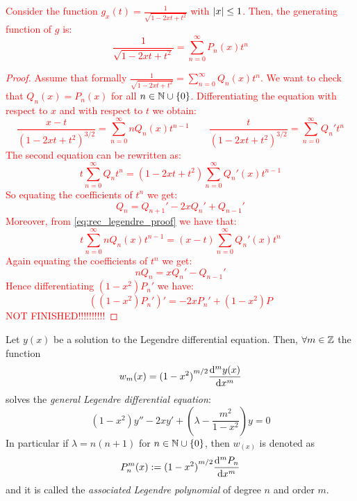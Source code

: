 \documentclass[../main.tex]{subfiles}
\begin{document}
\textcolor{red}{\begin{proposition}
    Consider the function $g_x(t)=\frac{1}{\sqrt{1-2xt+t^2}}$ with $\abs{x}\leq 1$. Then, the generating function of $g$ is:
    \begin{equation}
      \frac{1}{\sqrt{1-2xt+t^2}}=\sum_{n=0}^{\infty}P_n(x)t^n
    \end{equation}
  \end{proposition}
  \begin{proof}
    Assume that formally $\frac{1}{\sqrt{1-2xt+t^2}}=\sum_{n=0}^{\infty}Q_n(x)t^n$. We want to check that $Q_n(x)=P_n(x)$ for all $n\in\mathbb{N}\cup\{0\}$. Differentiating the equation with respect to $x$ and with respect to $t$ we obtain:
    \begin{equation}\label{eq:rec_legendre_proof}
      \frac{x-t}{{(1-2xt+t^2)}^{3/2}}=\sum_{n=0}^{\infty}nQ_n(x)t^{n-1}\qquad\frac{t}{{(1-2xt+t^2)}^{3/2}}=\sum_{n=0}^{\infty}{Q_n}'t^n
    \end{equation}
    The second equation can be rewritten as:
    \begin{equation}
      t\sum_{n=0}^{\infty}Q_n t^n=(1-2xt+t^2)\sum_{n=0}^{\infty}{Q_n}'(x)t^{n-1}
    \end{equation}
    So equating the coefficients of $t^n$ we get:
    \begin{equation}
      Q_{n}={Q_{n+1}}'-2x{Q_n}'+{Q_{n-1}}'
    \end{equation}
    Moreover, from \cref{eq:rec_legendre_proof} we have that:
    \begin{equation}
      t\sum_{n=0}^{\infty}nQ_n(x)t^{n-1}=(x-t)\sum_{n=0}^{\infty}{Q_n}'(x)t^{n}
    \end{equation}
    Again equating the coefficients of $t^n$ we get:
    \begin{equation}
      nQ_n=x{Q_n}'-{Q_{n-1}}'
    \end{equation}
    Hence differentiating $(1-x^2){P_n}'$ we have:
    \begin{equation}
      {((1-x^2){P_n}')}'=-2x{P_n}'+(1-x^2)P
    \end{equation}
    \textcolor{red}{NOT FINISHED!!!!!!!!!!}
  \end{proof}}
\begin{proposition}\label{prop:associate_legendre}
  Let $y(x)$ be a solution to the Legendre differential equation. Then, $\forall m\in\mathbb{Z}$ the function
  \begin{equation}
    w_m(x)={(1-x^2)}^{m/2} \dv[m]{y(x)}{x}
  \end{equation}
  solves the \emph{general Legendre differential equation}:
  \begin{equation}
    (1-x^2)y''-2xy'+\left(\lambda - \frac{m^2}{1-x^2}\right) y=0
  \end{equation}
  In particular if $\lambda=n(n+1)$ for $n\in\mathbb{N}\cup\{0\}$, then $w_(x)$ is denoted as
  \begin{equation}
    P_n^m(x):={(1-x^2)}^{m/2} \dv[m]{P_n}{x}
  \end{equation}
  and it is called the \emph{associated Legendre polynomial} of degree $n$ and order $m$.
\end{proposition}
\end{document}
